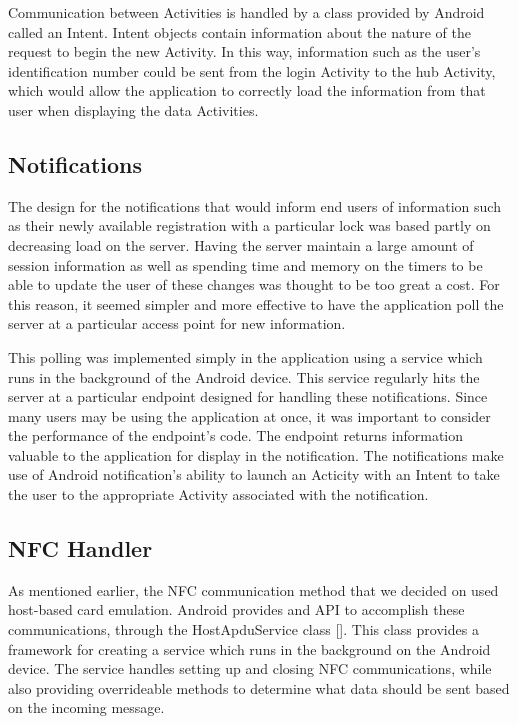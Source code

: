\documentclass[12pt]{report}
\begin{document}
Communication between Activities is handled by a class provided by Android called an Intent. Intent objects contain
information about the nature of the request to begin the new Activity. In this way, information such as the user's
identification number could be sent from the login Activity to the hub Activity, which would allow the application to
correctly load the information from that user when displaying the data Activities.


\subsection{Notifications}

The design for the notifications that would inform end users of information such as their newly available registration
with a particular lock was based partly on decreasing load on the server. Having the server maintain a large amount of
session information as well as spending time and memory on the timers to be able to update the user of these changes
was thought to be too great a cost. For this reason, it seemed simpler and more effective to have the application poll
the server at a particular access point for new information.

This polling was implemented simply in the application using a service which runs in the background of the Android
device. This service regularly hits the server at a particular endpoint designed for handling these notifications. Since
many users may be using the application at once, it was important to consider the performance of the endpoint's code.
The endpoint returns information valuable to the application for display in the notification. The notifications make use
of Android notification's ability to launch an Acticity with an Intent to take the user to the appropriate Activity
associated with the notification.


\subsection{NFC Handler}

As mentioned earlier, the NFC communication method that we decided on used host-based card emulation. Android provides
and API to accomplish these communications, through the HostApduService class []. This class provides a framework for
creating a service which runs in the background on the Android device. The service handles setting up and closing NFC
communications, while also providing overrideable methods to determine what data should be sent based on the incoming
message.
\end{document}
